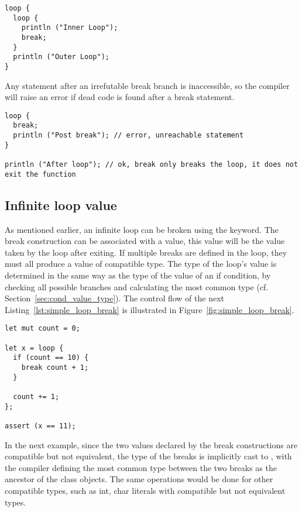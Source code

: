 \begin{lstlisting}[style=coloredverbatim]
loop {
  loop {
    println ("Inner Loop");
    break;
  }
  println ("Outer Loop");
}
\end{lstlisting}

Any statement after an irrefutable break branch is inaccessible, so the compiler
will raise an error if dead code is found after a break statement.

\begin{lstlisting}[style=coloredverbatim]
loop {
  break;
  println ("Post break"); // error, unreachable statement
}

println ("After loop"); // ok, break only breaks the loop, it does not exit the function
\end{lstlisting}

\subsection {Infinite loop value}

As mentioned earlier, an infinite loop can be broken using the 
keyword. The break construction can be associated with a value, this value will
be the value taken by the loop after exiting. If multiple breaks are defined in
the loop, they must all produce a value of compatible type. The type of the
loop's value is determined in the same way as the type of the value of an if
condition, by checking all possible branches and calculating the most common
type (cf. Section~\ref{sec:cond_value_type}). The control flow of the next
Listing~\ref{lst:simple_loop_break} is illustrated in
Figure~\ref{fig:simple_loop_break}.

\begin{lstlisting}[style=coloredverbatim, label=lst:simple_loop_break, caption=Breaking a loop with a value]
let mut count = 0;

let x = loop {
  if (count == 10) {
    break count + 1;
  }

  count += 1;
};

assert (x == 11);
\end{lstlisting}




In the next example, since the two values declared by the break
constructions are compatible but not equivalent, the type of the breaks is
implicitly cast to , with the compiler defining the most common type
between the two breaks as the ancestor of the class objects. The same operations
would be done for other compatible types, such as int, char literals with
compatible but not equivalent types.

